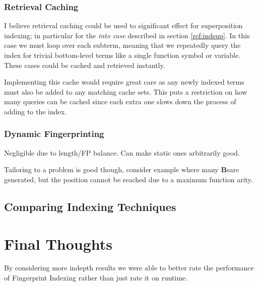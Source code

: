 \subsubsection{Retrieval Caching}

I believe retrieval caching could be used to significant effect for superposition
indexing; in particular for the \emph{into case} described in section \ref{ref:indsup}.
In this case we must loop over each subterm, meaning that we repeatedly query the index
for trivial bottom-level terms like a single function symbol or variable. These cases
could be cached and retrieved instantly.

Implementing this cache would require great care as any newly indexed terms must
also be added to any matching cache sets. This puts a restriction on how many queries
can be cached since each extra one slows down the process of adding to the index.

\subsubsection{Dynamic Fingerprinting}
Negligible due to length/FP balance. Can make static ones arbitrarily good.

Tailoring to a problem is good though, consider example where many \textbf{B}sare generated,
 but the position cannot be reached due to a maximum function arity.

\subsection{Comparing Indexing Techniques}

\section{Final Thoughts}

By considering more indepth results we were able to better rate the performance
of Fingerprint Indexing rather than just rate it on runtime.

